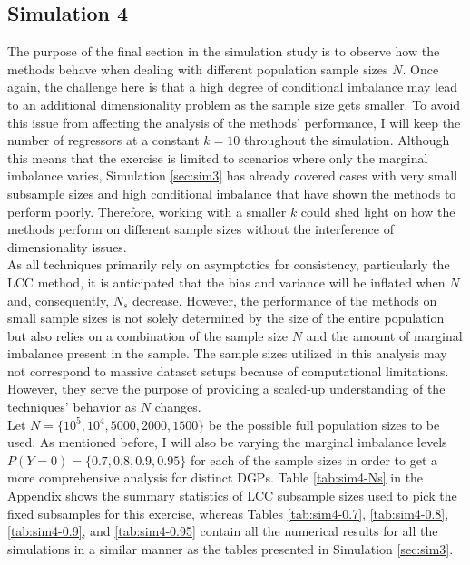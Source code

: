 \subsection{Simulation 4}
\label{sec:sim4}


The purpose of the final section in the simulation study is to observe how the methods behave when dealing with different population sample sizes $N$. Once again, the challenge here is that a high degree of conditional imbalance may lead to an additional dimensionality problem as the sample size gets smaller. To avoid this issue from affecting the analysis of the methods' performance, I will keep the number of regressors at a constant $k=10$ throughout the simulation. Although this means that the exercise is limited to scenarios where only the marginal imbalance varies, Simulation \ref{sec:sim3} has already covered cases with very small subsample sizes and high conditional imbalance that have shown the methods to perform poorly. Therefore, working with a smaller $k$ could shed light on how the methods perform on different sample sizes without the interference of dimensionality issues.\\

As all techniques primarily rely on asymptotics for consistency, particularly the LCC method, it is anticipated that the bias and variance will be inflated when $N$ and, consequently, $N_s$ decrease. However, the performance of the methods on small sample sizes is not solely determined by the size of the entire population but also relies on a combination of the sample size $N$ and the amount of marginal imbalance present in the sample. The sample sizes utilized in this analysis may not correspond to massive dataset setups because of computational limitations. However, they serve the purpose of providing a scaled-up understanding of the techniques' behavior as $N$ changes.\\

Let $N=\{10^5, 10^4, 5000, 2000, 1500 \}$ be the possible full population sizes to be used. As mentioned before, I will also be varying the marginal imbalance levels $P(Y=0)=\{0.7, 0.8, 0.9, 0.95\}$ for each of the sample sizes in order to get a more comprehensive analysis for distinct DGPs. Table \ref{tab:sim4-Ns} in the Appendix shows the summary statistics of LCC subsample sizes used to pick the fixed subsamples for this exercise, whereas Tables \ref{tab:sim4-0.7}, \ref{tab:sim4-0.8}, \ref{tab:sim4-0.9}, and \ref{tab:sim4-0.95} contain all the numerical results for all the simulations in a similar manner as the tables presented in Simulation \ref{sec:sim3}.\\


